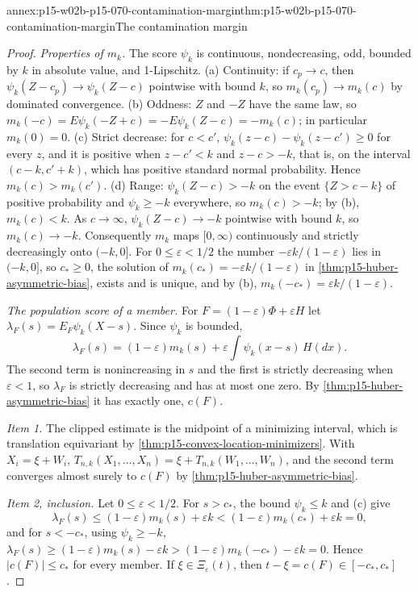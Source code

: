 \begin{annexitem}{annex:p15-w02b-p15-070-contamination-margin}{thm:p15-w02b-p15-070-contamination-margin}{The contamination margin}
\begin{proof}
\emph{Properties of \(m_k\).} The score \(\psi_k\) is continuous,
nondecreasing, odd, bounded by \(k\) in absolute value, and
1-Lipschitz.
(a) Continuity: if \(c_p\to c\), then \(\psi_k(Z-c_p)\to\psi_k(Z-c)\)
pointwise with bound \(k\), so \(m_k(c_p)\to m_k(c)\) by dominated
convergence.
(b) Oddness: \(Z\) and \(-Z\) have the same law, so
\(m_k(-c)=E\psi_k(-Z+c)=-E\psi_k(Z-c)=-m_k(c)\); in particular
\(m_k(0)=0\).
(c) Strict decrease: for \(c<c'\),
\(\psi_k(z-c)-\psi_k(z-c')\geq0\) for every \(z\), and it is positive
when \(z-c'<k\) and \(z-c>-k\), that is, on the interval
\((c-k,c'+k)\), which has positive standard normal probability.
Hence \(m_k(c)>m_k(c')\).
(d) Range: \(\psi_k(Z-c)>-k\) on the event \(\{Z>c-k\}\) of positive
probability and \(\psi_k\geq-k\) everywhere, so \(m_k(c)>-k\); by (b),
\(m_k(c)<k\). As \(c\to\infty\), \(\psi_k(Z-c)\to-k\) pointwise with
bound \(k\), so \(m_k(c)\to-k\).
Consequently \(m_k\) maps \([0,\infty)\) continuously and strictly
decreasingly onto \((-k,0]\). For \(0\leq\varepsilon<1/2\) the number
\(-\varepsilon k/(1-\varepsilon)\) lies in \((-k,0]\), so \(c_*\geq0\),
the solution of \(m_k(c_*)=-\varepsilon k/(1-\varepsilon)\) in
\cref{thm:p15-huber-asymmetric-bias}, exists and is unique, and by (b),
\(m_k(-c_*)=\varepsilon k/(1-\varepsilon)\).

\emph{The population score of a member.} For
\(F=(1-\varepsilon)\Phi+\varepsilon H\) let
\(\lambda_F(s)=E_F\psi_k(X-s)\). Since \(\psi_k\) is bounded,
\[
 \lambda_F(s)=(1-\varepsilon)m_k(s)+\varepsilon\int\psi_k(x-s)\,H(dx).
\]
The second term is nonincreasing in \(s\) and the first is strictly
decreasing when \(\varepsilon<1\), so \(\lambda_F\) is strictly
decreasing and has at most one zero. By
\cref{thm:p15-huber-asymmetric-bias} it has exactly one, \(c(F)\).

\emph{Item 1.} The clipped estimate is the midpoint of a minimizing
interval, which is translation equivariant by
\cref{thm:p15-convex-location-minimizers}. With \(X_i=\xi+W_i\),
\(T_{n,k}(X_1,\ldots,X_n)=\xi+T_{n,k}(W_1,\ldots,W_n)\), and the second
term converges almost surely to \(c(F)\) by
\cref{thm:p15-huber-asymmetric-bias}.

\emph{Item 2, inclusion.} Let \(0\leq\varepsilon<1/2\). For
\(s>c_*\), the bound \(\psi_k\leq k\) and (c) give
\[
 \lambda_F(s)\leq(1-\varepsilon)m_k(s)+\varepsilon k
 <(1-\varepsilon)m_k(c_*)+\varepsilon k=0,
\]
and for \(s<-c_*\), using \(\psi_k\geq-k\),
\(\lambda_F(s)\geq(1-\varepsilon)m_k(s)-\varepsilon k
>(1-\varepsilon)m_k(-c_*)-\varepsilon k=0\). Hence
\(|c(F)|\leq c_*\) for every member. If
\(\xi\in\Xi_\varepsilon(t)\), then \(t-\xi=c(F)\in[-c_*,c_*]\).


\end{proof}
\end{annexitem}
